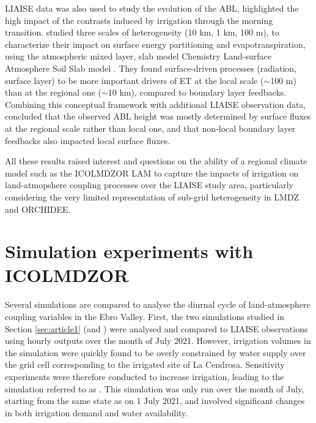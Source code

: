 LIAISE data was also used to study the evolution of the ABL, \citet{brooke_irrigation_2023} highlighted the high impact of the contrasts induced by irrigation through the morning transition. 
\citet{mangan_evapotranspiration_2023} studied three scales of heterogeneity (10 km, 1 km, 100 m), to characterize their impact on surface energy partitioning and evapotranspiration, using the atmospheric mixed layer, slab model Chemistry Land-surface Atmosphere Soil Slab model \citep[\href{https://classmodel.github.io/}{CLASS},][]{arellano_atmospheric_2015}. They found surface-driven processes (radiation, surface layer) to be more important drivers of ET at the local scale ($\sim$100 m) than at the regional one  ($\sim$10 km), compared to boundary layer feedbacks. 
Combining this conceptual framework with additional LIAISE observation data, \citet{mangan_surface-boundary_2023} concluded that the observed ABL height was mostly determined by surface fluxes at the regional scale rather than local one, and that non-local boundary layer feedbacks also impacted local surface fluxes.

\hfill

All these results raised interest and questions on the ability of a regional climate model such as the ICOLMDZOR LAM to capture the impacts of irrigation on land-atmopshere coupling processes over the LIAISE study area, particularly considering the very limited representation of sub-grid heterogeneity in LMDZ and ORCHIDEE.

\clearpage

\section{Simulation experiments with ICOLMDZOR}

Several simulations are compared to analyse the diurnal cycle of land-atmosphere coupling variables in the Ebro Valley.
First, the two simulations studied in Section \ref{sec:article1} (\noirr and \irr) were analysed and compared to LIAISE observations using hourly outputs over the month of July 2021. However, irrigation volumes in the \irr simulation were quickly found to be overly constrained by water supply over the grid cell corresponding to the irrigated site of La Cendrosa. Sensitivity experiments were therefore conducted to increase irrigation, leading to the simulation referred to as \irrboost. This simulation was only run over the month of July, starting from the same state as \irr on 1 July 2021, and involved significant changes in both irrigation demand and water availability.

